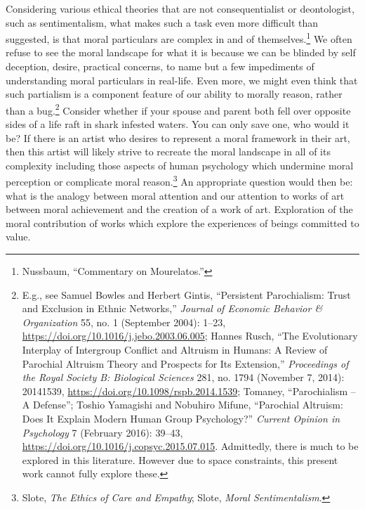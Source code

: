 \documentclass[phdthesis,12pt,final]{wuthesis}
\theoremstyle{definition}
\theoremstyle{definition}
\theoremstyle{definition}
\theoremstyle{definition}
\theoremstyle{remark}
\begin{document}
Considering various ethical theories that are not consequentialist or deontologist, such as sentimentalism, what makes such a task even more difficult than suggested, is that moral particulars are complex in and of themselves.\footnote{Nussbaum, {``Commentary on {Mourelatos}.''}} We often refuse to see the moral landscape for what it is because we can be blinded by self deception, desire, practical concerns, to name but a few impediments of understanding moral particulars in real-life. Even more, we might even think that such partialism is a component feature of our ability to morally reason, rather than a bug.\footnote{E.g., see Samuel Bowles and Herbert Gintis, {``Persistent {Parochialism}: {Trust} and Exclusion in Ethnic Networks,''} \emph{Journal of Economic Behavior \& Organization} 55, no. 1 (September 2004): 1--23, \url{https://doi.org/10.1016/j.jebo.2003.06.005}; Hannes Rusch, {``The Evolutionary Interplay of Intergroup Conflict and Altruism in Humans: A Review of Parochial Altruism Theory and Prospects for Its Extension,''} \emph{Proceedings of the Royal Society B: Biological Sciences} 281, no. 1794 (November 7, 2014): 20141539, \url{https://doi.org/10.1098/rspb.2014.1539}; Tomaney, {``Parochialism -- {A Defense}''}; Toshio Yamagishi and Nobuhiro Mifune, {``Parochial {Altruism}: {Does It Explain Modern Human Group Psychology}?''} \emph{Current Opinion in Psychology} 7 (February 2016): 39--43, \url{https://doi.org/10.1016/j.copsyc.2015.07.015}. Admittedly, there is much to be explored in this literature. However due to space constraints, this present work cannot fully explore these.} Consider whether if your spouse and parent both fell over opposite sides of a life raft in shark infested waters. You can only save one, who would it be? If there is an artist who desires to represent a moral framework in their art, then this artist will likely strive to recreate the moral landscape in all of its complexity including those aspects of human psychology which undermine moral perception or complicate moral reason.\footnote{Slote, \emph{The {Ethics} of {Care} and {Empathy}}; Slote, \emph{Moral {Sentimentalism}}.} An appropriate question would then be: what is the analogy between moral attention and our attention to works of art between moral achievement and the creation of a work of art. Exploration of the moral contribution of works which explore the experiences of beings committed to value.
\end{document}

